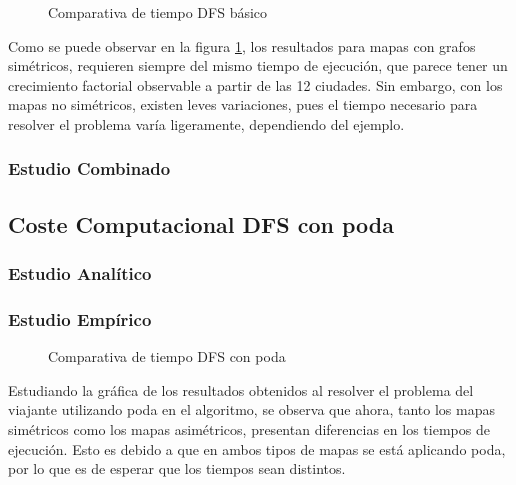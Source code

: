 \documentclass{uc3mpracticas}
\begin{document}
  \vspace{2mm}
  
  \begin{figure}[!h]
    \caption{Comparativa de tiempo DFS básico}
    \label{fig:compDFS}
  \end{figure}
  
  \newpage
  
  Como se puede observar en la figura \ref{fig:compDFS}, los resultados para mapas con grafos simétricos, requieren siempre del mismo tiempo de ejecución, que parece tener un crecimiento factorial observable a partir de las 12 ciudades. Sin embargo, con los mapas no simétricos, existen leves variaciones, pues el tiempo necesario para resolver el problema varía ligeramente, dependiendo del ejemplo.

  \subsubsection{Estudio Combinado}

  \subsection{Coste Computacional DFS con poda}

  \subsubsection{Estudio Analítico}

  \subsubsection{Estudio Empírico}
  
  \begin{figure}[!h]
    \caption{Comparativa de tiempo DFS con poda}
  \end{figure}

  Estudiando la gráfica de los resultados obtenidos al resolver el problema del viajante utilizando poda en el algoritmo, se observa que ahora, tanto los mapas simétricos como los mapas asimétricos, presentan diferencias en los tiempos de ejecución. Esto es debido a que en ambos tipos de mapas se está aplicando poda, por lo que es de esperar que los tiempos sean distintos.

  \vspace{2mm}
\end{document}
